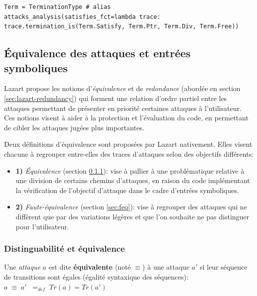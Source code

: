 \begin{lstlisting}    
Term = TerminationType # alias
attacks_analysis(satisfies_fct=lambda trace: trace.termination_is(Term.Satisfy, Term.Ptr, Term.Div, Term.Free))
\end{lstlisting}   
            
        \subsection{Équivalence des attaques et entrées symboliques}
        \label{sec:lazart-equivalence}
            
            Lazart propose les notions d'\textit{équivalence} et de \textit{redondance} (abordée en section \ref{sec:lazart-redundancy}) qui forment une relation d'ordre partiel entre les attaques permettant de présenter en priorité certaines attaques à l'utilisateur.
            Ces notions visent à aider à la protection et l'évaluation du code, en permettant de cibler les attaques jugées plus importantes.   
            
            Deux définitions d'équivalence sont proposées par Lazart nativement. Elles visent chacune à regrouper entre-elles des traces d'attaques selon des objectifs différents:
            \begin{itemize}
                \item[] \textbf{1)} \textit{Équivalence} (section \ref{sec:eq}): vise à pallier à une problématique relative à une division de certains chemins d'attaques, en raison du code implémentant la vérification de l'objectif d'attaque dans le cadre d'entrées symboliques.
                \item[] \textbf{2)} \textit{Faute-équivalence} (section \ref{sec:feq}): vise à regrouper des attaques qui ne diffèrent que par des variations légères et que l'on souhaite ne pas distinguer pour l'utilisateur.
            \end{itemize}
        
            \subsubsection{Distinguabilité et équivalence}
            \label{sec:eq}

                \begin{defi}[Équivalence]
                    \label{def:eq}
                    Une \textit{attaque} $a$ est dite \textbf{équivalente} (noté $\equiv$) à une attaque $a'$ si leur séquence de transitions sont égales (égalité syntaxique des séquences): \\
                    $a \; \equiv \; a' \;\;=_{def} \; Tr(a) = Tr(a')$ %
                \end{defi}
            
